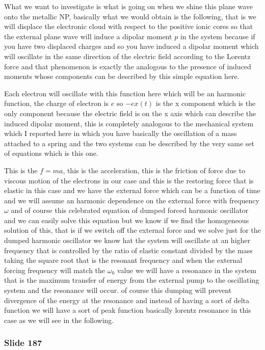 \documentclass[../main/main.tex]{subfiles}
\begin{document}
What we want to investigate is what is going on when we shine this plane wave onto the metallic NP, basically what we would obtain is the following, that is we will displace the electronic cloud with respect to the positive ionic cores so that the external plane wave will induce a dipolar moment $p$ in the system because if you have two displaced charges and so you have induced a dipolar moment which will oscillate in the same direction of the electric field according to the Lorentz force and that phenomenon is exactly the analogous to the presence of induced moments whose components can be described by this simple equation here. 

Each electron will oscillate with this function here which will be an harmonic function, the charge of electron is $e$ so $-ex(t)$ is the x component which is the only component because the electric field is on the x axis which can describe the induced dipolar moment, this is completely analogous to the mechanical system which I reported here in which you have basically the oscillation of a mass attached to a spring and the two systems can be described by the very same set of equations which is this one.

This is the $f=ma$, this is the acceleration, this is the friction of force due to viscous motion of the electrons in our case and this is the restoring force that is elastic in this case and we have the external force which can be a function of time and we will assume an harmonic dependence on the external force with frequency $\omega$ and of course this celebrated equation of dumped forced harmonic oscillator and we can easily solve this equation but we know if we find the homogeneous solution of this, that is if we switch off the external force and we solve just for the dumped harmonic oscillator we know hat the system will oscillate at an higher frequency that is controlled by the ratio of elastic constant divided by the mass taking the square root that is the resonant frequency and when the external forcing frequency will match the $\omega_0$ value we will have a resonance in the system that is the maximum transfer of energy from the external pump to the oscillating system and the resonance will occur. of course this dumping will prevent divergence of the energy at the resonance and instead of having a sort of delta function we will have a sort of peak function basically lorentz resonance in this case as we will see in the following.

\newpage

\subsubsection{Slide 187}
\end{document}
